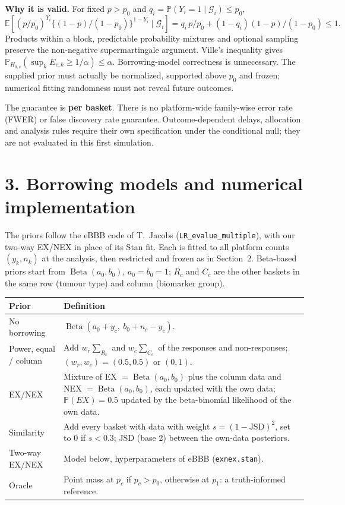 \documentclass[10pt,a4paper]{article}
\newcommand{\E}{\mathbb E}
\newcommand{\Prob}{\mathbb P}
\begin{document}
\textbf{Why it is valid.} For fixed $p>p_0$ and
$q_i=\Prob(Y_i=1\mid\mathcal G_i)\le p_0$,
\[
 \E\!\left[
  (p/p_0)^{Y_i}\{(1-p)/(1-p_0)\}^{1-Y_i}
  \mid\mathcal G_i\right]
 =q_i\,p/p_0+(1-q_i)(1-p)/(1-p_0)\le1.
\]
Products within a block, predictable probability mixtures and optional
sampling preserve the non-negative supermartingale argument. Ville's
inequality gives $\Prob_{H_{0,c}}(\sup_k E_{c,k}\ge1/\alpha)\le\alpha$.
Borrowing-model correctness is unnecessary. The supplied prior must actually
be normalized, supported above $p_0$ and frozen; numerical fitting randomness
must not reveal future outcomes.

The guarantee is \textbf{per basket}. There is no platform-wide family-wise
error rate (FWER) or false discovery rate guarantee. Outcome-dependent
delays, allocation and analysis rules require their own specification under
the conditional null; they are not evaluated in this first simulation.

\newpage
\section*{3. Borrowing models and numerical implementation}
The priors follow the eBBB code of T.~Jacobs (\texttt{LR\_evalue\_multiple}),
with our two-way EX/NEX in place of its Stan fit. Each is fitted to all
platform counts $(y_k,n_k)$ at the analysis, then restricted and frozen as in
Section~2. Beta-based priors start from $\operatorname{Beta}(a_0,b_0)$,
$a_0=b_0=1$; $R_c$ and $C_c$ are the other baskets in the same row (tumour type)
and column (biomarker group).

\begin{tabularx}{\linewidth}{@{}p{3.3cm}X@{}}
\toprule
Prior & Definition\\
\midrule
No borrowing & $\operatorname{Beta}(a_0+y_c,\ b_0+n_c-y_c)$.\\
Power, equal / column & Add $w_r\sum_{R_c}$ and $w_c\sum_{C_c}$ of the responses and non-responses; $(w_r,w_c)=(0.5,0.5)$ or $(0,1)$.\\
EX/NEX & Mixture of EX $=\operatorname{Beta}(a_0,b_0)$ plus the column data and NEX $=\operatorname{Beta}(a_0,b_0)$, each updated with the own data; $\Prob(EX)=0.5$ updated by the beta-binomial likelihood of the own data.\\
Similarity & Add every basket with data with weight $s=(1-\mathrm{JSD})^{2}$, set to 0 if $s<0.3$; JSD (base 2) between the own-data posteriors.\\
Two-way EX/NEX & Model below, hyperparameters of eBBB (\texttt{exnex.stan}).\\
Oracle & Point mass at $p_c$ if $p_c>p_0$, otherwise at $p_1$: a truth-informed reference.\\
\bottomrule
\end{tabularx}
\end{document}
